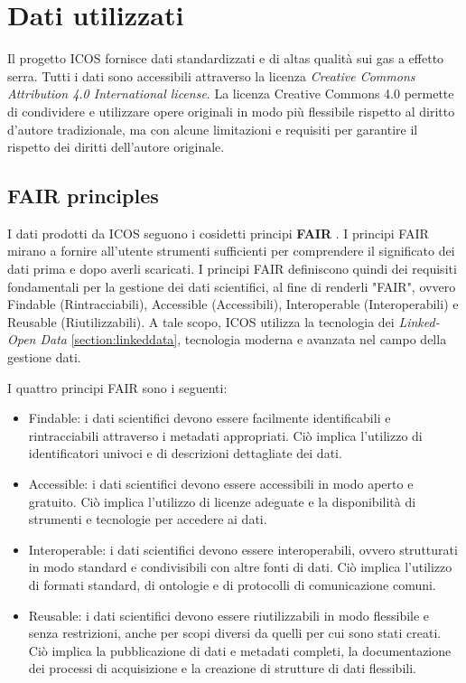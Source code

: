 \chapter{Dati utilizzati}
\label{chap:dati}

Il progetto ICOS fornisce dati standardizzati e di altas qualità sui gas a effetto serra.
Tutti i dati sono accessibili attraverso la licenza \textit{Creative Commons Attribution 4.0 International license}.
La licenza Creative Commons 4.0 permette di condividere e utilizzare opere originali in modo più flessibile rispetto
al diritto d'autore tradizionale, ma con alcune limitazioni e requisiti per garantire il rispetto dei diritti dell'autore originale.

\section{FAIR principles}
\label{section:fair}
I dati prodotti da ICOS seguono i cosidetti principi \textbf{FAIR} \cite{FAIRManifest}.
I principi FAIR mirano a fornire all'utente strumenti sufficienti per 
comprendere il significato dei dati prima e dopo averli scaricati. 
I principi FAIR definiscono quindi dei requisiti fondamentali per
la gestione dei dati scientifici, al fine di renderli "FAIR",
ovvero Findable (Rintracciabili), Accessible (Accessibili), Interoperable (Interoperabili) e 
Reusable (Riutilizzabili). A tale scopo, ICOS utilizza la tecnologia dei \textit{Linked-Open Data} \ref{section:linkeddata},
tecnologia moderna e avanzata nel campo della gestione dati. 

I quattro principi FAIR sono i seguenti:

\begin{itemize}
    \item Findable: i dati scientifici devono essere facilmente identificabili e rintracciabili attraverso i metadati appropriati.
    Ciò implica l'utilizzo di identificatori univoci e di descrizioni dettagliate dei dati.
    \item Accessible: i dati scientifici devono essere accessibili in modo aperto e gratuito.
    Ciò implica l'utilizzo di licenze adeguate e la disponibilità di strumenti e tecnologie per accedere ai dati.
    \item Interoperable: i dati scientifici devono essere interoperabili, ovvero strutturati in modo standard
    e condivisibili con altre fonti di dati. Ciò implica l'utilizzo di formati standard, di ontologie e di protocolli
    di comunicazione comuni.
    \item Reusable: i dati scientifici devono essere riutilizzabili
    in modo flessibile e senza restrizioni, anche per scopi diversi da quelli
    per cui sono stati creati. Ciò implica la pubblicazione di dati e metadati completi,
    la documentazione dei processi di acquisizione e la creazione di strutture di dati flessibili.
\end{itemize}


